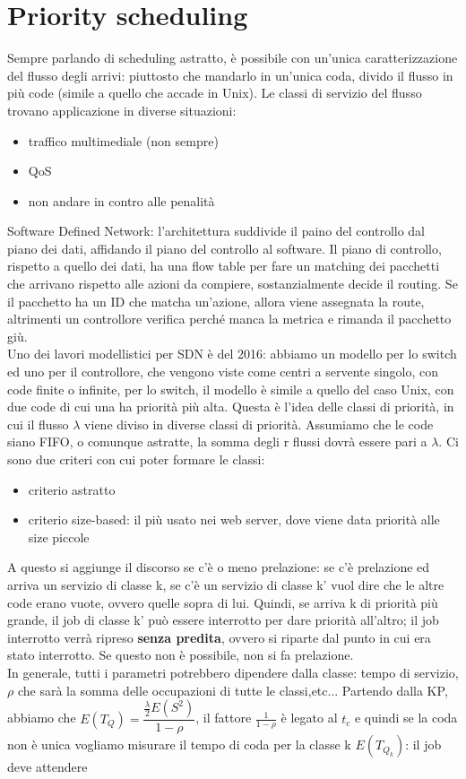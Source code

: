 \documentclass{article}
\begin{document}
\section{Priority scheduling}
Sempre parlando di scheduling astratto, è possibile con un'unica caratterizzazione del flusso degli arrivi: piuttosto che mandarlo in un'unica coda, divido il flusso in più code (simile a quello che accade in Unix). Le classi di servizio del flusso trovano applicazione in diverse situazioni:
\begin{itemize}
\item traffico multimediale (non sempre)
\item QoS
\item non andare in contro alle penalità
\end{itemize}
Software Defined Network: l'architettura suddivide il paino del controllo dal piano dei dati, affidando il piano del controllo al software. Il piano di controllo, rispetto a quello dei dati, ha una flow table per fare un matching dei pacchetti che arrivano rispetto alle azioni da compiere, sostanzialmente decide il routing. Se il pacchetto ha un ID che matcha un'azione, allora viene assegnata la route, altrimenti un controllore verifica perché manca la metrica e rimanda il pacchetto giù.\\ Uno dei lavori modellistici per SDN è del 2016: abbiamo un modello per lo switch ed uno per il controllore, che vengono viste come centri a servente singolo, con code finite o infinite,  per lo switch, il modello è simile a quello del caso Unix, con due code di cui una ha priorità più alta. Questa è l'idea delle classi di priorità, in cui il flusso $\lambda$ viene diviso in diverse classi di priorità. Assumiamo che le code siano FIFO, o comunque astratte, la somma degli r flussi dovrà essere pari a $\lambda$. Ci sono due criteri con cui poter formare le classi:
\begin{itemize}
\item criterio astratto
\item criterio size-based: il più usato nei web server, dove viene data priorità alle size piccole
\end{itemize}
A questo si aggiunge il discorso se c'è o meno prelazione: se c'è prelazione ed arriva un servizio di classe k, se c'è un servizio di classe k' vuol dire che le altre code erano vuote, ovvero quelle sopra di lui. Quindi, se arriva k di priorità più grande, il job di classe k' può essere interrotto per dare priorità all'altro; il job interrotto verrà ripreso \textbf{senza predita}, ovvero si riparte dal punto in cui era stato interrotto. Se questo non è possibile, non si fa prelazione. \\ In generale, tutti i parametri potrebbero dipendere dalla classe: tempo di servizio, $\rho$ che sarà la somma delle occupazioni di tutte le classi,etc... Partendo dalla KP, abbiamo che $E(T_Q) = \dfrac{\frac{\lambda}{2}E(S^2)}{1 - \rho}$, il fattore $\frac{1}{1 - \rho}$ è legato al $t_c$ e quindi se la coda non è unica vogliamo misurare il tempo di coda per la classe k $E(T_{Q_{k}})$: il job deve attendere 
\end{document}
